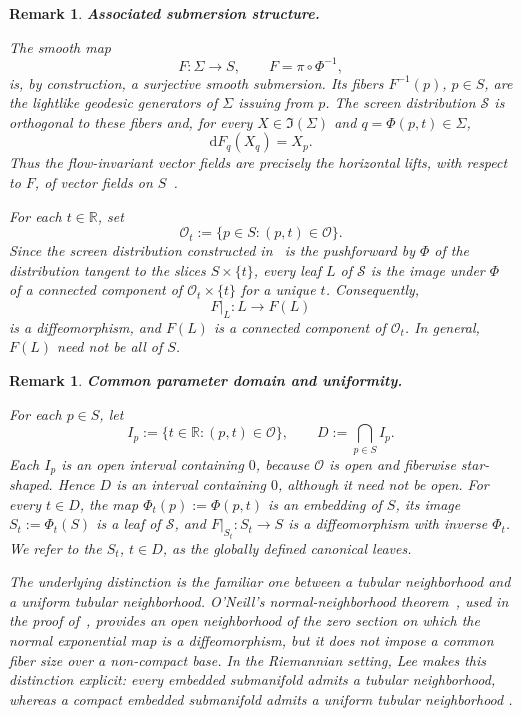 \documentclass[11pt]{article}
\numberwithin{equation}{section}
\newtheorem{remark}[theorem]{Remark}
\begin{document}
	

	
	\begin{remark}\label{remark:submersion}
		\textbf{Associated submersion structure.} \normalfont

		The smooth map
		\[
			F\colon\Sigma\longrightarrow S,
			\qquad
			F=\pi\circ\Phi^{-1},
		\]
		is, by construction, a surjective smooth submersion. Its fibers
		$F^{-1}(p)$, $p\in S$, are the lightlike geodesic generators of
		$\Sigma$ issuing from $p$. The screen distribution $\mathcal S$ is
		orthogonal to these fibers and, for every
		$X\in\mathfrak I(\Sigma)$ and $q=\Phi(p,t)\in\Sigma$,
		\[
			\mathrm dF_q(X_q)=X_p.
		\]
		Thus the flow-invariant vector fields are precisely the horizontal
		lifts, with respect to $F$, of vector fields on $S$~\cite{oneill}.

		For each $t\in\mathbb R$, set
		\[
			\mathscr O_t:=\{p\in S:(p,t)\in\mathscr O\}.
		\]
		Since the screen distribution constructed in~ is the
		pushforward by $\Phi$ of the distribution tangent to the slices
		$S\times\{t\}$, every leaf $L$ of $\mathcal S$ is the image under
		$\Phi$ of a connected component of
		$\mathscr O_t\times\{t\}$ for a unique $t$. Consequently,
		\[
			F|_L\colon L\longrightarrow F(L)
		\]
		is a diffeomorphism, and $F(L)$ is a connected component of
		$\mathscr O_t$. In general, $F(L)$ need not be all of $S$.
	\end{remark}

	\begin{remark}\label{remark:common-domain}
		\textbf{Common parameter domain and uniformity.} \normalfont

		For each $p\in S$, let
		\[
			I_p:=\{t\in\mathbb R:(p,t)\in\mathscr O\},
			\qquad
			D:=\bigcap_{p\in S}I_p.
		\]
		Each $I_p$ is an open interval containing $0$, because $\mathscr O$
		is open and fiberwise star-shaped. Hence $D$ is an interval containing
		$0$, although it need not be open. For every $t\in D$, the map
		$\Phi_t(p):=\Phi(p,t)$ is an embedding of $S$, its image
		$S_t:=\Phi_t(S)$ is a leaf of $\mathcal S$, and
		$F|_{S_t}\colon S_t\to S$ is a diffeomorphism with inverse $\Phi_t$.
		We refer to the $S_t$, $t\in D$, as the globally defined
		\emph{canonical leaves}.

		The underlying distinction is the familiar one between a tubular
		neighborhood and a uniform tubular neighborhood. O'Neill's
		normal-neighborhood theorem~\cite[Prop.~7.26]{oneill}, used in the
		proof of~, provides an open neighborhood of the zero
		section on which the normal exponential map is a diffeomorphism, but
		it does not impose a common fiber size over a non-compact base. In
		the Riemannian setting, Lee makes this distinction explicit:
		every embedded submanifold admits a tubular neighborhood, whereas a
		compact embedded submanifold admits a uniform tubular neighborhood
		\cite[Th.~5.25]{LeeRiem}.
	\end{remark}
\end{document}
